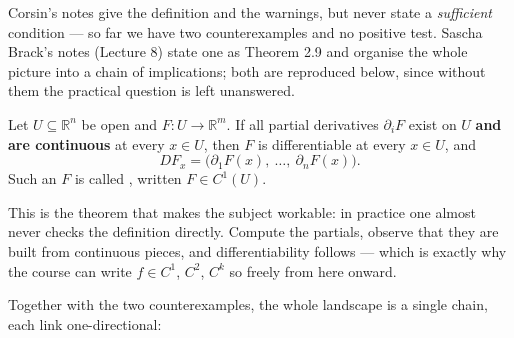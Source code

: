 \begin{ainote}
Corsin's notes give the definition and the warnings, but never state a \emph{sufficient}
condition --- so far we have two counterexamples and no positive test. Sascha Brack's notes
(Lecture 8) state one as Theorem 2.9 and organise the whole picture into a chain of
implications; both are reproduced below, since without them the practical question
 is left unanswered.
\end{ainote}

\begin{theorem}
\label{thm:continuous_partials_imply_differentiable}
Let $U \subseteq \mathbb{R}^n$ be open and $F : U \to \mathbb{R}^m$. If all partial derivatives
$\partial_iF$ exist on $U$ \textbf{and are continuous} at every $x \in U$, then $F$ is
differentiable at every $x \in U$, and
\[DF_x = \big(\partial_1F(x),\ \dots,\ \partial_nF(x)\big).\]
Such an $F$ is called , written $F \in C^1(U)$.
\end{theorem}

This is the theorem that makes the subject workable: in practice one almost never checks the
definition directly. Compute the partials, observe that they are built from continuous pieces,
and differentiability follows --- which is exactly why the course can write $f \in C^1$, $C^2$,
$C^k$ so freely from here onward.

Together with the two counterexamples, the whole landscape is a single chain, each link
one-directional:

